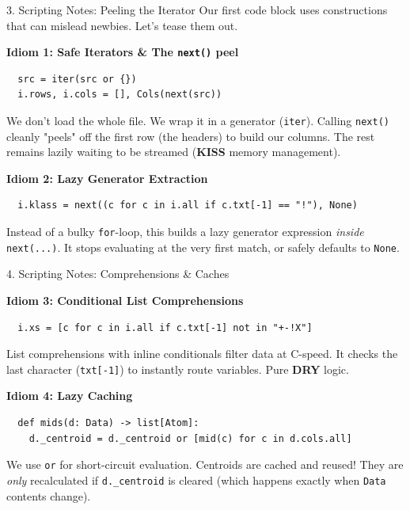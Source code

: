 \begin{frame}[fragile]{3. Scripting Notes: Peeling the Iterator}
  \vspace{0.2cm}
  Our first code block uses constructions that can mislead newbies. Let's tease them out.

  \vspace{0.3cm}
  \textbf{Idiom 1: Safe Iterators \& The \texttt{next()} peel}
  \begin{verbatim}
  src = iter(src or {})
  i.rows, i.cols = [], Cols(next(src))
  \end{verbatim}
  We don't load the whole file. We wrap it in a generator (\texttt{iter}). Calling \texttt{next()} cleanly "peels" off the first row (the headers) to build our columns. The rest remains lazily waiting to be streamed (\textbf{KISS} memory management).
  
  \vspace{0.3cm}
  \textbf{Idiom 2: Lazy Generator Extraction}
  \begin{verbatim}
  i.klass = next((c for c in i.all if c.txt[-1] == "!"), None)
  \end{verbatim}
  Instead of a bulky \texttt{for}-loop, this builds a lazy generator expression \textit{inside} \texttt{next(...)}. It stops evaluating at the very first match, or safely defaults to \texttt{None}.
\end{frame}

\begin{frame}[fragile]{4. Scripting Notes: Comprehensions \& Caches}
  
  \vspace{0.2cm}
  \textbf{Idiom 3: Conditional List Comprehensions}
  \begin{verbatim}
  i.xs = [c for c in i.all if c.txt[-1] not in "+-!X"]
  \end{verbatim}
  List comprehensions with inline conditionals filter data at C-speed. It checks the last character (\texttt{txt[-1]}) to instantly route variables. Pure \textbf{DRY} logic.

  \vspace{0.4cm}
  \textbf{Idiom 4: Lazy Caching}
  \begin{verbatim}
  def mids(d: Data) -> list[Atom]:
    d._centroid = d._centroid or [mid(c) for c in d.cols.all]
  \end{verbatim}
  We use \texttt{or} for short-circuit evaluation. Centroids are cached and reused! They are \textit{only} recalculated if \texttt{d.\_centroid} is cleared (which happens exactly when \texttt{Data} contents change).
\end{frame}

